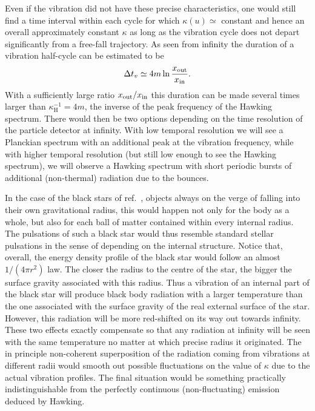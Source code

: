 \documentclass[12pt]{article}
\begin{document}
Even if the vibration did not have these precise characteristics,
one would still find a time interval  within each cycle for which
$\kappa(u) \simeq $ constant and hence an overall approximately constant $\kappa$ as long as the vibration cycle does not depart significantly from a free-fall trajectory. As seen from infinity the duration of a
vibration half-cycle can be estimated to be
%
\begin{eqnarray}
\Delta t_v\simeq 4 m \ln {x_{\rm out} \over x_{\rm in}}.
\end{eqnarray}
%
 With a sufficiently large ratio $x_{\rm out}/x_{\rm in}$ this duration can be
made several times larger than $\kappa_\text{H}^{-1} = 4m$, the inverse of the peak
frequency of the Hawking spectrum. There would then be two options depending on the time resolution of the particle detector at infinity. With low temporal resolution we will see a Planckian spectrum with an additional peak at the vibration frequency, while with higher  temporal resolution (but still low enough to see the Hawking spectrum), we will observe a Hawking spectrum with  short periodic bursts of additional (non-thermal) radiation due to the bounces.

In the case of the black stars of ref.~\cite{barcelo-fate}, objects always on the verge of falling into their
own gravitational radius,  this would happen not only for the body as a whole,
but also for each ball of matter contained within every internal radius. The pulsations of such a black star would thus resemble standard stellar pulsations in the sense of depending on the internal structure. Notice
that, overall, the energy density profile of the black star would follow an almost
$1/(4\pi r^2)$ law. 
The closer the radius to the centre of the star, the bigger the surface
gravity associated with this radius. Thus a vibration of an internal part of the
black star will produce black body radiation with a larger temperature
than the one associated with the surface gravity of the real external surface of
the star. However, this radiation will be more red-shifted on its way out
towards infinity. These two effects exactly compensate so that any
radiation at infinity will be seen with the same temperature no matter at which
precise radius  it originated. The in principle non-coherent superposition of the radiation coming from  vibrations at different  radii would smooth out possible  fluctuations on the value of $\kappa$ due to the actual vibration profiles.  The final situation would be  something practically indistinguishable from the perfectly continuous (non-fluctuating) emission deduced by Hawking.  
\end{document}
